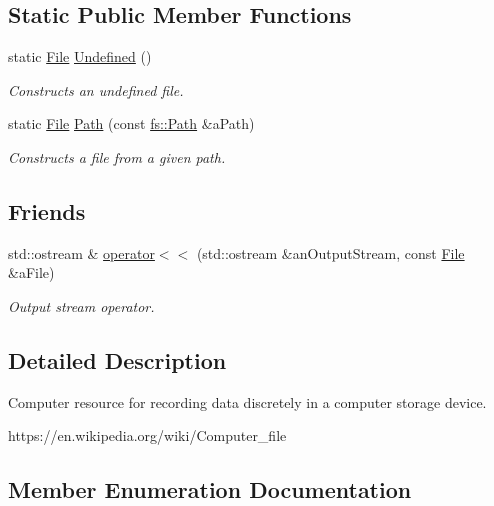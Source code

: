 \subsection*{Static Public Member Functions}
\begin{DoxyCompactItemize}
\item 
static \hyperlink{classostk_1_1core_1_1fs_1_1_file}{File} \hyperlink{classostk_1_1core_1_1fs_1_1_file_a0df3ba12f33cbbd8f24b9d35cd4afaee}{Undefined} ()
\begin{DoxyCompactList}\small\item\em Constructs an undefined file. \end{DoxyCompactList}\item 
static \hyperlink{classostk_1_1core_1_1fs_1_1_file}{File} \hyperlink{classostk_1_1core_1_1fs_1_1_file_ad677c6a3edc1e88c18226edebff1da03}{Path} (const \hyperlink{classostk_1_1core_1_1fs_1_1_path}{fs\+::\+Path} \&a\+Path)
\begin{DoxyCompactList}\small\item\em Constructs a file from a given path. \end{DoxyCompactList}\end{DoxyCompactItemize}
\subsection*{Friends}
\begin{DoxyCompactItemize}
\item 
std\+::ostream \& \hyperlink{classostk_1_1core_1_1fs_1_1_file_a82ce9f27653427d53ecb90de978f4f68}{operator$<$$<$} (std\+::ostream \&an\+Output\+Stream, const \hyperlink{classostk_1_1core_1_1fs_1_1_file}{File} \&a\+File)
\begin{DoxyCompactList}\small\item\em Output stream operator. \end{DoxyCompactList}\end{DoxyCompactItemize}


\subsection{Detailed Description}
Computer resource for recording data discretely in a computer storage device. 

https\+://en.wikipedia.\+org/wiki/\+Computer\+\_\+file 

\subsection{Member Enumeration Documentation}
\mbox{\label{classostk_1_1core_1_1fs_1_1_file_aef3d3e622ef15381a9f48c161e134da5}} 
